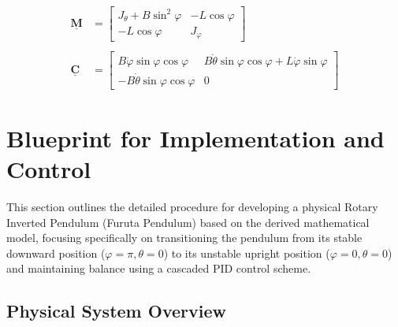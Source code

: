 \documentclass[12pt]{article}
\newcommand{\mb}[1]{\underline{\mathbf{#1}}}
\begin{document}
\begin{align*}
    \mb{M} &= \begin{bmatrix} J{}_\theta + B\sin^2\varphi & -L\cos\varphi \\ -L\cos\varphi & J{}_\varphi \end{bmatrix} \\
    \\
    \mb{C} &= \begin{bmatrix} B \dot{\varphi} \sin\varphi\cos\varphi & B \dot{\theta} \sin\varphi\cos\varphi + L \dot{\varphi} \sin\varphi \\ -B \dot{\theta} \sin\varphi\cos\varphi & 0 \end{bmatrix}
\end{align*}


\newpage
\section{Blueprint for Implementation and Control}

This section outlines the detailed procedure for developing a physical Rotary Inverted Pendulum (Furuta Pendulum) based on the derived mathematical model, focusing specifically on transitioning the pendulum from its stable downward position ($\varphi = \pi, \theta = 0$) to its unstable upright position ($\varphi = 0, \theta = 0$) and maintaining balance using a cascaded PID control scheme.

\subsection{Physical System Overview}
\end{document}
